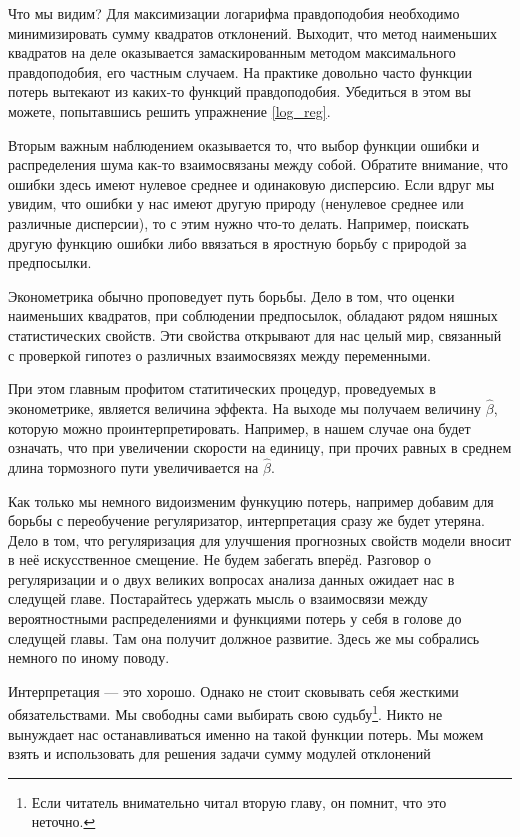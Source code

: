 \documentclass[12pt, a4paper, oneside]{extreport}
\def \hb{\hat{\beta}}
\theoremstyle{plain}              %
\theoremstyle{definition}         %
\begin{document}
Что мы видим? Для максимизации логарифма правдоподобия необходимо минимизировать сумму квадратов отклонений. Выходит, что метод наименьших квадратов на деле оказывается замаскированным методом максимального правдоподобия, его частным случаем. На практике довольно часто функции потерь вытекают из каких-то функций правдоподобия. Убедиться в этом вы можете, попытавшись решить упражнение \ref{log_reg}. 

Вторым важным наблюдением оказывается то, что выбор функции ошибки и распределения шума как-то взаимосвязаны между собой.  Обратите внимание, что ошибки здесь имеют нулевое среднее и одинаковую дисперсию. Если вдруг мы увидим, что ошибки у нас имеют другую природу (ненулевое среднее или различные дисперсии), то с этим нужно что-то делать. Например, поискать другую функцию ошибки либо ввязаться в яростную борьбу с природой за предпосылки. 

Эконометрика обычно проповедует путь борьбы. Дело в том, что оценки наименьших квадратов, при соблюдении предпосылок, обладают рядом няшных статистических свойств. Эти свойства открывают для нас целый мир, связанный с проверкой гипотез о различных взаимосвязях между переменными. 

При этом главным профитом статитических процедур, проведуемых в эконометрике,  является величина эффекта. На выходе мы получаем величину $\hb$, которую можно проинтерпретировать. Например, в нашем случае она будет означать, что при увеличении скорости на единицу, при прочих равных в среднем длина тормозного пути увеличивается на $\hb$. 

Как только мы немного видоизменим функуцию потерь, например добавим для борьбы с переобучение регуляризатор, интерпретация сразу же будет утеряна. Дело в том, что регуляризация для улучшения прогнозных свойств модели вносит в неё искусственное смещение.  Не будем забегать вперёд. Разговор о регуляризации и о двух великих вопросах анализа данных ожидает нас в следущей главе. Постарайтесь удержать  мысль о взаимосвязи между вероятностными распределениями и функциями потерь у себя в голове до следущей главы. Там она получит должное развитие. Здесь же мы собрались немного по иному поводу. 

Интерпретация --- это хорошо. Однако не стоит сковывать себя жесткими обязательствами.  Мы свободны сами выбирать свою судьбу\footnote{Если читатель внимательно читал вторую главу, он помнит, что это неточно.}. Никто не вынуждает нас останавливаться именно на такой функции потерь.  Мы можем взять и использовать для решения задачи сумму модулей отклонений
\end{document}

